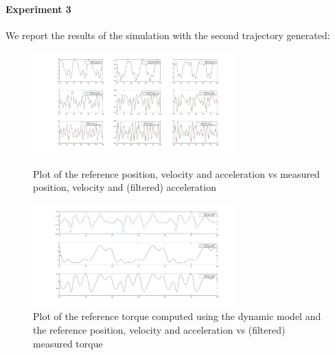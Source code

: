 \documentclass{article}
\begin{document}
\paragraph{Experiment 3}
We report the results of the simulation with the second trajectory generated:
\begin{figure}[!htbp]
\centering
\includegraphics[width=0.7\textwidth]{images/3-dof/experiment2_traj.png}
\caption{Plot of the reference position, velocity and acceleration vs measured position, velocity and (filtered) acceleration}
\includegraphics[width=0.7\textwidth]{images/3-dof/experiment2.png}
\caption{Plot of the reference torque computed using the dynamic model and the reference position, velocity and acceleration vs (filtered) measured torque}
\end{figure}
\pagebreak
\end{document}
